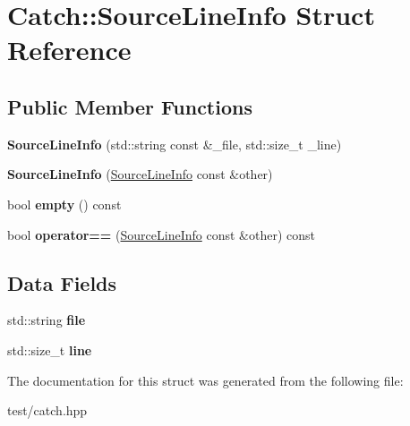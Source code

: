 \hypertarget{structCatch_1_1SourceLineInfo}{}\section{Catch\+:\+:Source\+Line\+Info Struct Reference}
\label{structCatch_1_1SourceLineInfo}
\subsection*{Public Member Functions}
\begin{DoxyCompactItemize}
\item 
{\bfseries Source\+Line\+Info} (std\+::string const \&\+\_\+file, std\+::size\+\_\+t \+\_\+line)\hypertarget{structCatch_1_1SourceLineInfo_ad75af709941dae9fcb07b7c5cd18294f}{}\label{structCatch_1_1SourceLineInfo_ad75af709941dae9fcb07b7c5cd18294f}

\item 
{\bfseries Source\+Line\+Info} (\hyperlink{structCatch_1_1SourceLineInfo}{Source\+Line\+Info} const \&other)\hypertarget{structCatch_1_1SourceLineInfo_a1ec99cc0547ce5909133aaa8f14ed4b1}{}\label{structCatch_1_1SourceLineInfo_a1ec99cc0547ce5909133aaa8f14ed4b1}

\item 
bool {\bfseries empty} () const \hypertarget{structCatch_1_1SourceLineInfo_a9a25ffc0640d1a3dd0c9b7e5fcbba7b9}{}\label{structCatch_1_1SourceLineInfo_a9a25ffc0640d1a3dd0c9b7e5fcbba7b9}

\item 
bool {\bfseries operator==} (\hyperlink{structCatch_1_1SourceLineInfo}{Source\+Line\+Info} const \&other) const \hypertarget{structCatch_1_1SourceLineInfo_af0854821b1abfda52796ef0f1294b050}{}\label{structCatch_1_1SourceLineInfo_af0854821b1abfda52796ef0f1294b050}

\end{DoxyCompactItemize}
\subsection*{Data Fields}
\begin{DoxyCompactItemize}
\item 
std\+::string {\bfseries file}\hypertarget{structCatch_1_1SourceLineInfo_adf3ccf0c2bd326eb3466318af82a94dd}{}\label{structCatch_1_1SourceLineInfo_adf3ccf0c2bd326eb3466318af82a94dd}

\item 
std\+::size\+\_\+t {\bfseries line}\hypertarget{structCatch_1_1SourceLineInfo_a841e5d696c7b9cde24e45e61dd979c77}{}\label{structCatch_1_1SourceLineInfo_a841e5d696c7b9cde24e45e61dd979c77}

\end{DoxyCompactItemize}


The documentation for this struct was generated from the following file\+:\begin{DoxyCompactItemize}
\item 
test/catch.\+hpp\end{DoxyCompactItemize}

